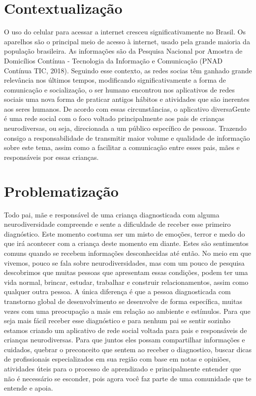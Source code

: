 \section{Contextualização}

O uso do celular para acessar a internet cresceu significativamente no Brasil. Os aparelhos são o principal meio de acesso à internet, usado pela grande maioria da população brasileira. As informações são da Pesquisa Nacional por Amostra de Domicílios Contínua - Tecnologia da Informação e Comunicação (PNAD Contínua TIC, 2018). Seguindo esse contexto, as redes socias têm ganhado grande relevância nos últimos tempos, modificando significativamente a forma de comunicação e socialização, o ser humano encontrou nos aplicativos de redes sociais uma nova forma de praticar antigos hábitos e atividades que são inerentes aos seres humanos. De acordo com essas circunstâncias, o aplicativo diversaGente é uma rede social com o foco voltado principalmente aos pais de crianças neurodiversas, ou seja, direcionada a um público específico de pessoas. Trazendo consigo a responsabilidade de transmitir maior volume e qualidade de informação sobre este tema, assim como a facilitar a comunicação entre esses pais, mães e responsáveis por essas crianças.

\section{Problematização}

Todo pai, mãe e responsável de uma criança diagnosticada com alguma neurodiversidade compreende e sente a dificuldade de receber esse primeiro diagnóstico. Este momento costuma ser um misto de emoções, terror e medo do que irá acontecer com a criança deste momento em diante. Estes são sentimentos comuns quando se recebem informações desconhecidas até então. No meio em que vivemos, pouco se fala sobre neurodiversidades, mas com um pouco de pesquisa descobrimos que muitas pessoas que apresentam essas condições, podem ter uma vida normal, brincar, estudar, trabalhar e construir relacionamentos, assim como qualquer outra pessoa. A única diferença é que a pessoa diagnosticada com transtorno global de desenvolvimento se desenvolve de forma específica, muitas vezes com uma preocupação a mais em relação ao ambiente e estímulos. Para que seja mais fácil receber esse diagnóstico e para nenhum pai se sentir sozinho estamos criando um aplicativo de rede social voltada para pais e responsáveis de crianças neurodiversas. Para que juntos eles possam compartilhar informações e cuidados, quebrar o preconceito que sentem ao receber o diagnostico, buscar dicas de profissionais especializados em sua região com base em notas e opiniões, atividades úteis para o processo de aprendizado e principalmente entender que não é necessário se esconder, pois agora você faz parte de uma comunidade que te entende e apoia.

